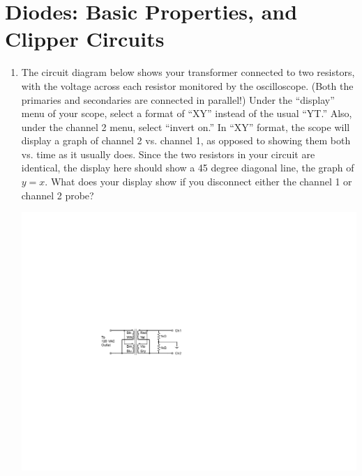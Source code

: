 \section{Diodes: Basic Properties, and Clipper Circuits}
\label{lab_diodes}


\bigskip

\begin{enumerate}[wide]

\item The circuit diagram below shows your transformer connected to two resistors, with the voltage across each resistor monitored by the oscilloscope.  (Both the primaries and secondaries are connected in parallel!)  Under the ``display'' menu of your scope, select a format of ``XY'' instead of the usual ``YT.''  Also, under the channel 2 menu, select ``invert on.'' In ``XY'' format, the scope will display a graph of channel 2 vs. channel 1, as opposed to showing them both vs. time as it usually does.  Since the two resistors in your circuit are identical, the display here should show a 45 degree diagonal line, the graph of $y = x$.  What does your display show if you disconnect either the channel 1 or channel 2 probe?
\vspace{-0.1in}
\begin{center}
\includegraphics{diodes/diode_testing_circuit_1.pdf}
\end{center}


\end{enumerate}
